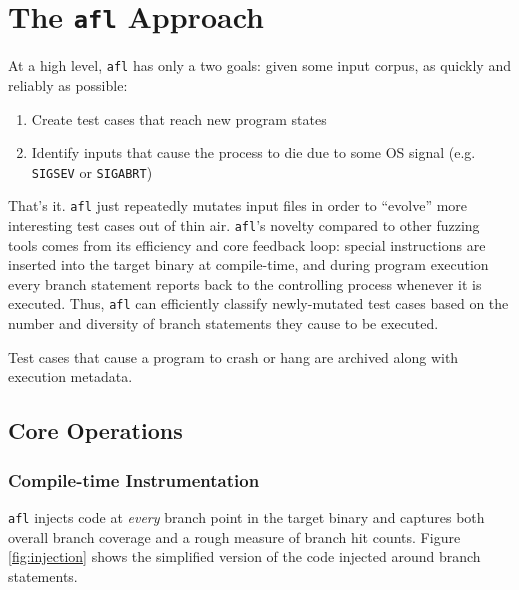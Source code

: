 \chapter{The \texttt{afl} Approach}


At a high level, \texttt{afl} has only a two goals: given some input corpus,
as quickly and reliably as possible:

\begin{enumerate}
    \item Create test cases that reach new program states
    \item Identify inputs that cause the process to die due to some
    OS signal (e.g. \texttt{SIGSEV} or \texttt{SIGABRT})
\end{enumerate}

That's it. \texttt{afl} just repeatedly mutates input files in order to
``evolve'' more interesting test cases out of thin air.
\texttt{afl}'s novelty compared to other fuzzing tools comes from its
efficiency and core feedback loop: special instructions are inserted into the
target binary at compile-time, and during program execution every branch
statement reports back to the controlling process whenever it is executed.
Thus, \texttt{afl} can efficiently classify newly-mutated test cases based on
the number and diversity of branch statements they cause to be executed.

Test cases that cause a program to crash or hang are archived along with
execution metadata.

\section{Core Operations}




\subsection{Compile-time Instrumentation}

\texttt{afl} injects code at \textit{every} branch point in the target
binary and captures both overall branch coverage and a rough measure of branch 
hit counts. Figure \ref{fig:injection} shows the simplified version of the code
injected around branch statements\cite{afl-whitepaper}.

